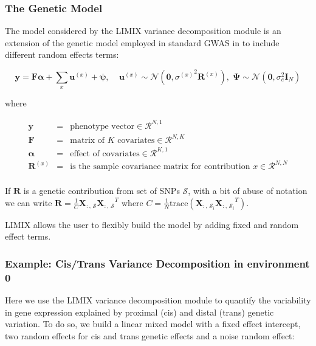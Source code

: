 \documentclass{article}
\begin{document}
    \subsubsection{The Genetic Model}


    The model considered by the LIMIX variance decomposition module is an
extension of the genetic model employed in standard GWAS in to include
different random effects terms:

\begin{equation}
\mathbf{y} = \mathbf{F}\boldsymbol{\alpha} + \sum_{x}\mathbf{u}^{(x)} + \boldsymbol{\psi},\;\;\;\;
\mathbf{u}^{(x)}\sim\mathcal{N}\left(\mathbf{0},{\sigma^{(x)}}^2\mathbf{R}^{(x)}\right),\;
\boldsymbol{\Psi}\sim\mathcal{N}\left(\mathbf{0},\sigma_e^2\mathbf{I}_N\right)
\end{equation}

where

\begin{eqnarray}
\mathbf{y}   &=& \text{phenotype vector} \in \mathcal{R}^{N,1} \\
\mathbf{F}   &=& \text{matrix of $K$ covariates} \in \mathcal{R}^{N,K} \\
\boldsymbol{\alpha} &=& \text{effect of covariates} \in \mathcal{R}^{K,1} \\
\mathbf{R}^{(x)}   &=& \text{is the sample covariance matrix for contribution $x$} \in \mathcal{R}^{N,N} \\
\end{eqnarray}

If $\mathbf{R}$ is a genetic contribution from set of SNPs
$\mathcal{S}$, with a bit of abuse of notation we can write
$\mathbf{R}= \frac{1}{C}\mathbf{X}_{:,\,\mathcal{S}}{\mathbf{X}_{:,\,\mathcal{S}}}^T$
where
$C=\frac{1}{N}\text{trace}\left(\mathbf{X}_{:,\,\mathcal{S}_i}{\mathbf{X}_{:,\,\mathcal{S}_i}}^T\right)$.

LIMIX allows the user to flexibly build the model by adding fixed and
random effect terms.


    \subsubsection{Example: Cis/Trans Variance Decomposition in environment 0}


    Here we use the LIMIX variance decomposition module to quantify the
variability in gene expression explained by proximal (cis) and distal
(trans) genetic variation. To do so, we build a linear mixed model with
a fixed effect intercept, two random effects for cis and trans genetic
effects and a noise random effect:
\end{document}

